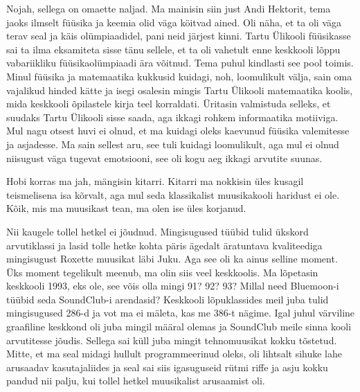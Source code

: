 
Nojah, sellega on omaette naljad. Ma mainisin siin just Andi Hektorit,  tema 
jaoks ilmselt  füüsika ja keemia olid väga köitvad ained. Oli näha, et ta oli 
väga terav seal ja käis olümpiaadidel, pani neid järjest kinni. Tartu Ülikooli 
füüsikasse sai ta ilma eksamiteta sisse tänu sellele, et ta oli vahetult enne 
keskkooli lõppu vabariikliku füüsikaolümpiaadi ära võitnud. Tema puhul 
kindlasti see pool toimis.  Minul füüsika ja matemaatika kukkusid kuidagi, noh, 
loomulikult välja, sain oma vajalikud hinded kätte ja isegi 
osalesin mingis Tartu Ülikooli matemaatika koolis, mida keskkooli õpilastele 
kirja teel  korraldati. Üritasin  valmistuda selleks, et suudaks  Tartu 
Ülikooli sisse saada, aga ikkagi rohkem informaatika motiiviga. Mul nagu 
otsest huvi ei olnud, et ma kuidagi oleks kaevunud füüsika valemitesse ja 
asjadesse. Ma sain sellest aru, see tuli kuidagi loomulikult, aga mul ei olnud 
niisugust väga tugevat emotsiooni, see oli kogu aeg ikkagi 
arvutite suunas. 


Hobi korras ma jah, mängisin kitarri. Kitarri ma nokkisin üles kusagil 
teismelisena isa kõrvalt, aga  mul seda klassikalist muusikakooli haridust ei 
ole. Kõik, mis ma muusikast tean, ma olen ise üles korjanud. 


Nii kaugele tollel hetkel ei jõudnud. Mingisugused tüübid tulid ükskord  
arvutiklassi ja lasid  tolle hetke kohta päris ägedalt äratuntava 
kvaliteediga mingisugust Roxette muusikat  läbi Juku. Aga see oli ka ainus selline 
moment. Üks moment tegelikult meenub, ma olin siis veel keskkoolis. Ma 
lõpetasin keskkooli 1993, eks ole, see võis olla mingi 91? 92? 93? Millal need 
Bluemoon-i tüübid seda SoundClub-i 
arendasid? Keskkooli lõpuklassides 
meil juba tulid mingisugused 286-d ja vot ma ei mäleta, kas me 386-t nägime. 
Igal juhul värviline  graafiline keskkond oli juba mingil määral olemas ja 
SoundClub meile sinna kooli arvutitesse jõudis. Sellega sai küll juba mingit 
tehnomuusikat kokku tõstetud. Mitte, et ma seal midagi hullult programmeerinud 
oleks, oli lihtsalt sihuke lahe arusaadav kasutajaliides ja  seal sai siis 
igasuguseid rütmi riffe ja asju kokku pandud  nii palju, kui tollel hetkel  
muusikalist arusaamist oli. 

